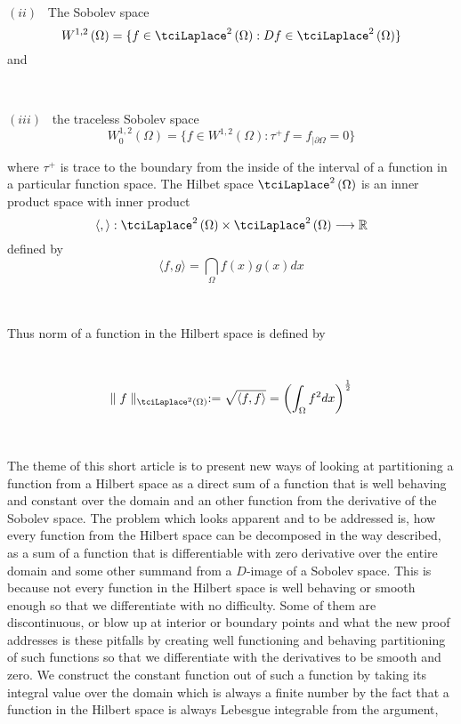 \documentclass{amsproc}
\theoremstyle{plain}
\numberwithin{equation}{section}
\begin{document}
\ \ \ \ 

$(ii)$ \ The Sobolev space 
\begin{equation*}
W^{1,2}\left( \Omega \right) =\{f\in \tciLaplace ^{2}\left( \Omega \right)
:Df\in \tciLaplace ^{2}\left( \Omega \right) \}
\end{equation*}and

\ \ 

$(iii)$ \ the traceless Sobolev space 
\begin{equation*}
W_{0}^{1,2}\left( \Omega \right) =\{f\in W^{1,2}\left( \Omega \right) :\tau
^{+}f=f_{\mid \partial \Omega }=0\}
\end{equation*}

where $\tau ^{+}$ is trace to the boundary from the inside of the interval
of a function in a particular function space. The Hilbet space $\tciLaplace
^{2}\left( \Omega \right) $ is an inner product space with inner product 
\begin{equation*}
\langle ,\rangle :\tciLaplace ^{2}\left( \Omega \right) \times \tciLaplace
^{2}\left( \Omega \right) \longrightarrow 
\mathbb{R}\end{equation*}defined by 
\begin{equation*}
\langle f,g\rangle =\dint\limits_{\Omega }f\left( x\right) g\left( x\right)
dx
\end{equation*}

\ \ \ \ \ \ \ \ \ \ 

Thus norm of a function in the Hilbert space is defined by

\ \ \ 
\begin{equation*}
\parallel f\parallel _{\tciLaplace ^{2}\left( \Omega \right) }:=\sqrt{\left\langle f,f\right\rangle }=\left( \int_{\Omega }f^{2}dx\right) ^{\frac{1}{2}}
\end{equation*}

\ \ \ 

The theme of this short article is to present new ways of looking at
partitioning a function from a Hilbert space as a direct sum of a function
that is well behaving and constant over the domain and an other function
from the derivative of the Sobolev space. The problem which looks apparent
and to be addressed is, how every function from the Hilbert space can be
decomposed in the way described, as a sum of a function that is
differentiable with zero derivative over the entire domain and some other
summand from a $D$-image of a Sobolev space. This is because not every
function in the Hilbert space is well behaving or smooth enough so that we
differentiate with no difficulty. Some of them are discontinuous, or blow up
at interior or boundary points and what the new proof addresses is these
pitfalls by creating well functioning and behaving partitioning of such
functions so that we differentiate with the derivatives to be smooth and
zero. We construct the constant function out of such a function by taking
its integral value over the domain which is always a finite number by the
fact that a function in the Hilbert space is always Lebesgue integrable from
the argument,
\end{document}
